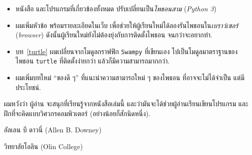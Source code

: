 \begin{itemize}


\item หนังสือ และโปรแกรมที่เกี่ยวข้องทั้งหมด ปรับเปลี่ยนเป็น\textit{ไพธอนสาม} (\textit{Python 3})


\item ผมเพิ่มหัวข้อ พร้อมรายละเอียดในเว็บ 
เพื่อช่วยให้ผู้เรียนใหม่ได้ลองรันไพธอนใน\textit{เบราว์เซอร์} (\textit{browser})
ดังนั้นผู้เรียนใหม่ยังไม่ต้องยุ่งกับการติดตั้งไพธอน จนกว่าจะอยากทำ.


\item บท~\ref{turtle} ผมเปลี่ยนจากโมดูลกราฟฟิก \texttt{Swampy} ที่เขียนเอง ไปเป็นโมดูลมาตราฐานของไพธอน \texttt{turtle}
ที่ติดตั้งง่ายกว่า แล้วก็มีความสามารถมากกว่า.


\item ผมเพิ่มบทใหม่ ``ของดี ๆ'' ที่แนะนำความสามารถใหม่ ๆ ของไพธอน
ที่อาจจะไม่ได้จำเป็น แต่มีประโยชน์.

\end{itemize}


ผมหวังว่า ผู้อ่าน จะสนุกที่เรียนรู้จากหนังสือเล่มนี้
และว่ามันจะได้ช่วยผู้อ่านเรียนเขียนโปรแกรม 
และฝึกที่จะคิดแบบวิศวกรคอมพิวเตอร์ (อย่างน้อยก็สักนิดหนึ่ง).

\hfill อัลเลน บี ดาวนี่ (Allen B. Downey)

\hfill วิทยาลัยโอลิน (Olin College) \\

